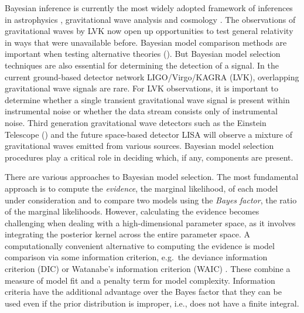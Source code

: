 \documentclass[%
 reprint,
 amsmath,amssymb,
 aps,
]{revtex4-2}
\begin{document}
Bayesian inference is currently the most widely adopted framework of inferences in astrophysics \cite{saha1994unfolding}, gravitational wave analysis \cite{christensen1998markov} and cosmology \cite{christensen2001bayesian, knox2001age}. 
The observations of gravitational waves by LVK now open up opportunities to test general relativity in ways that were unavailable before. Bayesian model comparison methods are important when testing alternative theories (\cite{rouder2018theories}). But Bayesian model selection techniques are also essential for determining the detection of a signal.
In the current 
ground-based detector network LIGO/Virgo/KAGRA (LVK), overlapping gravitational wave signals are rare. For LVK observations,  it is important to determine whether a single transient gravitational wave signal is present within instrumental noise or whether the data stream consists only of instrumental noise. Third generation gravitational wave detectors such as the Einstein Telescope (\cite{punturo2010einstein}) and the future space-based detector LISA will 
observe a mixture of gravitational waves emitted from various sources. Bayesian model selection procedures play a critical role in deciding which, if any,  components are present. 

There are various approaches to Bayesian model selection. The most fundamental approach is to compute the {\em evidence}, the marginal likelihood, of each model under consideration and to compare two models using the {\em Bayes factor}, the ratio of the marginal likelihoods. However, calculating the evidence becomes challenging when dealing with a high-dimensional parameter space, as it involves integrating the posterior kernel  across the entire parameter space.
A computationally convenient alternative to computing the evidence is model comparison via some information criterion, e.g.\ the deviance information criterion (DIC) \cite{spiegelhalter2002bayesian} or Watanabe's information criterion (WAIC) \cite{WatanabeSumio2010AEoB}. These combine a measure of model fit and a penalty term for model complexity. Information criteria have the additional advantage over the Bayes factor that they can be used even if the prior distribution is improper, i.e., does not have a finite integral. 
\end{document}
